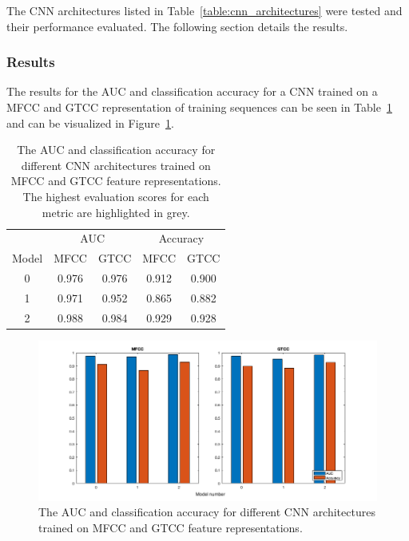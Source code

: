 The CNN architectures listed in Table~\ref{table:cnn_architectures} were tested
and their performance evaluated. The following section details the results.

\subsubsection{Results}

The results for the AUC and classification accuracy for a CNN trained on a MFCC
and GTCC representation of training sequences can be seen in
Table~\ref{table:cnn_mfcc_results} and can be visualized in
Figure~\ref{fig:cnn_mfcc_results}.

\begin{table}[h!t]
\begin{center}
\begin{tabular}{c c c|c c}
\toprule
& \multicolumn{2}{c|}{AUC} & \multicolumn{2}{c}{Accuracy} \\
  Model & MFCC & GTCC & MFCC & GTCC \\ [0.5ex]
\midrule
  0 & 0.976 & 0.976 & 0.912 & 0.900 \\
  1 & 0.971 & 0.952 & 0.865 & 0.882 \\
  2 & \cellcolor{lightgray} 0.988 & \cellcolor{lightgray} 0.984 & \cellcolor{lightgray} 0.929 & \cellcolor{lightgray} 0.928 \\
\bottomrule
\end{tabular}
\caption{The AUC and classification accuracy for different CNN architectures
trained on MFCC and GTCC feature representations. The highest evaluation scores
for each metric are highlighted in grey.}\label{table:cnn_mfcc_results}
\end{center}
\end{table}

\begin{figure}[ht]
  \centering
  \includegraphics[width=\textwidth]{figures/hyp2_cnn_bar.png}
  \caption{The AUC and classification accuracy for different CNN architectures
  trained on MFCC and GTCC feature representations.}\label{fig:cnn_mfcc_results}
\end{figure}

